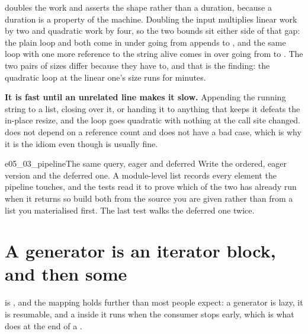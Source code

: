  doubles the work and asserts the shape
rather than a duration, because a duration is a property of the machine.
Doubling the input multiplies linear work by two and quadratic work by
four, so the two bounds sit either side of that gap: the plain loop and
 both come in under  going from
 appends to , and the same
loop with one more reference to the string alive comes in over
 going from  to
. The two pairs of sizes differ because they have
to, and that is the finding: the quadratic loop at the linear one's size
runs for minutes.

\begin{trapbox}
\textbf{It is fast until an unrelated line makes it slow.} Appending the
running string to a list, closing over it, or handing it to anything that
keeps it defeats the in-place resize, and the loop goes quadratic with
nothing at the call site changed.  does not depend on
a reference count and does not have a bad case, which is why it is the
idiom even though \code{+=} is usually fine.
\end{trapbox}

\begin{exercise}{e05_03_pipeline}{The same query, eager and deferred}
Write the ordered, eager version and the deferred one. A module-level list
records every element the pipeline touches, and the tests read it to prove
which of the two has already run when it returns \dash{} so build both from
the source you are given rather than from a list you materialised first.
The last test walks the deferred one twice.
\end{exercise}

\section{A generator is an iterator block, and then some}
\label{sec:ch05-generators}

 is , and the mapping holds further than
most people expect: a generator is lazy, it is resumable, and a
 inside it runs when the consumer stops early, which is what
 does at the end of a .


